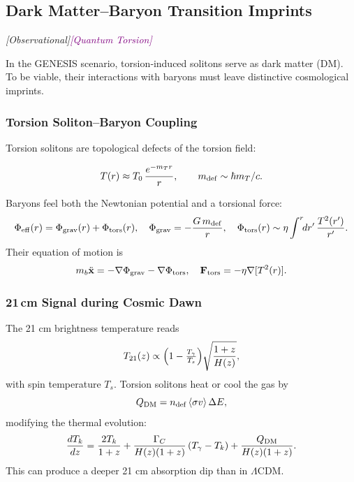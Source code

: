 \documentclass{article}
\newcommand{\quantumtag}{\textcolor{purple}{\textit{[Quantum Torsion]}}}
\newcommand{\obstag}{\textcolor{green!60!black}{\textit{[Observational]}}}
\begin{document}


\subsection{Dark Matter–Baryon Transition Imprints}
\label{subsec:dm_baryon_imprints}
\obstag \quantumtag

In the GENESIS scenario, torsion‐induced solitons serve as dark matter (DM).
To be viable, their interactions with baryons must leave distinctive cosmological
imprints.

\subsubsection{ Torsion Soliton–Baryon Coupling}
Torsion solitons are topological defects of the torsion field:

\begin{equation}
  T(r)\approx T_0\,\frac{e^{-m_Tr}}{r}, 
  \qquad m_{\rm def}\sim\hbar m_T/c.
\end{equation}

Baryons feel both the Newtonian potential and a torsional force:
\begin{equation}\label{eq:auto124}
\Phi_{\rm eff}(r)=\Phi_{\rm grav}(r)+\Phi_{\rm tors}(r),
  \quad
  \Phi_{\rm grav}=-\frac{G\,m_{\rm def}}{r}, 
  \quad
  \Phi_{\rm tors}(r)\sim\eta\int^r\!\!dr'\,\frac{T^2(r')}{r'}.
\end{equation}
Their equation of motion is
\begin{equation}\label{eq:auto125}
m_b\ddot{\mathbf x}
  = -\nabla\Phi_{\rm grav}
    -\nabla\Phi_{\rm tors},
  \quad
  \mathbf F_{\rm tors}=-\eta\nabla[T^2(r)].
\end{equation}

\subsubsection{ 21\,cm Signal during Cosmic Dawn}
The 21 cm brightness temperature reads
\begin{equation}\label{eq:auto126}
T_{21}(z)\propto\Bigl(1-\tfrac{T_\gamma}{T_s}\Bigr)
    \sqrt{\frac{1+z}{H(z)}},
\end{equation}
with spin temperature \(T_s\).  Torsion solitons heat or cool the gas by
\begin{equation}\label{eq:auto127}
Q_{\rm DM}
  = n_{\rm def}\,\langle\sigma v\rangle\,\Delta E,
\end{equation}
modifying the thermal evolution:
\begin{equation}\label{eq:auto128}
\frac{dT_k}{dz}
  = \frac{2T_k}{1+z}
    + \frac{\Gamma_C}{H(z)(1+z)}\,(T_\gamma - T_k)
    + \frac{Q_{\rm DM}}{H(z)(1+z)}.
\end{equation}
This can produce a deeper 21 cm absorption dip than in $\Lambda$CDM.
\end{document}
